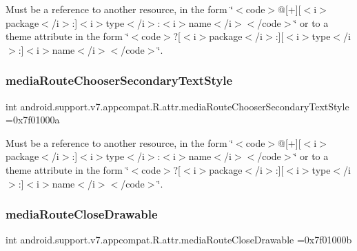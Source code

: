 Must be a reference to another resource, in the form \char`\"{}$<$code$>$@\mbox{[}+\mbox{]}\mbox{[}$<$i$>$package$<$/i$>$\+:\mbox{]}$<$i$>$type$<$/i$>$\+:$<$i$>$name$<$/i$>$$<$/code$>$\char`\"{} or to a theme attribute in the form \char`\"{}$<$code$>$?\mbox{[}$<$i$>$package$<$/i$>$\+:\mbox{]}\mbox{[}$<$i$>$type$<$/i$>$\+:\mbox{]}$<$i$>$name$<$/i$>$$<$/code$>$\char`\"{}. \mbox{\label{classandroid_1_1support_1_1v7_1_1appcompat_1_1R_1_1attr_a44ae777de2f2a894e734c6d1877c7100}} 
\subsubsection{\texorpdfstring{media\+Route\+Chooser\+Secondary\+Text\+Style}{mediaRouteChooserSecondaryTextStyle}}
{\footnotesize\ttfamily int android.\+support.\+v7.\+appcompat.\+R.\+attr.\+media\+Route\+Chooser\+Secondary\+Text\+Style =0x7f01000a\hspace{0.3cm}{\ttfamily [static]}}

Must be a reference to another resource, in the form \char`\"{}$<$code$>$@\mbox{[}+\mbox{]}\mbox{[}$<$i$>$package$<$/i$>$\+:\mbox{]}$<$i$>$type$<$/i$>$\+:$<$i$>$name$<$/i$>$$<$/code$>$\char`\"{} or to a theme attribute in the form \char`\"{}$<$code$>$?\mbox{[}$<$i$>$package$<$/i$>$\+:\mbox{]}\mbox{[}$<$i$>$type$<$/i$>$\+:\mbox{]}$<$i$>$name$<$/i$>$$<$/code$>$\char`\"{}. \mbox{\label{classandroid_1_1support_1_1v7_1_1appcompat_1_1R_1_1attr_aeba04d711d7391c1136a642cc3890891}} 
\subsubsection{\texorpdfstring{media\+Route\+Close\+Drawable}{mediaRouteCloseDrawable}}
{\footnotesize\ttfamily int android.\+support.\+v7.\+appcompat.\+R.\+attr.\+media\+Route\+Close\+Drawable =0x7f01000b\hspace{0.3cm}{\ttfamily [static]}}

